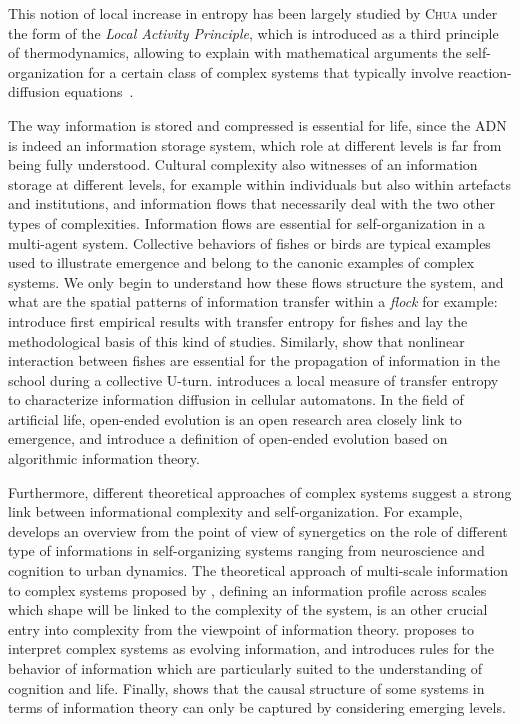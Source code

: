 \documentclass[graybox]{svmult}
\newcommand{\noun}[1]{\textsc{#1}}
\begin{document}
This notion of local increase in entropy has been largely studied by \noun{Chua} under the form of the \emph{Local Activity Principle}, which is introduced as a third principle of thermodynamics, allowing to explain with mathematical arguments the self-organization for a certain class of complex systems that typically involve reaction-diffusion equations~\cite{mainzer2013local}.


The way information is stored and compressed is essential for life, since the ADN is indeed an information storage system, which role at different levels is far from being fully understood. Cultural complexity also witnesses of an information storage at different levels, for example within individuals but also within artefacts and institutions, and information flows that necessarily deal with the two other types of complexities. Information flows are essential for self-organization in a multi-agent system. Collective behaviors of fishes or birds are typical examples used to illustrate emergence and belong to the canonic examples of complex systems. We only begin to understand how these flows structure the system, and what are the spatial patterns of information transfer within a \emph{flock} for example: \cite{crosato2017informative} introduce first empirical results with transfer entropy for fishes and lay the methodological basis of this kind of studies. Similarly, \cite{lecheval2018social} show that nonlinear interaction between fishes are essential for the propagation of information in the school during a collective U-turn. \cite{lizier2008local} introduces a local measure of transfer entropy to characterize information diffusion in cellular automatons. In the field of artificial life, open-ended evolution is an open research area closely link to emergence, and \cite{corominas2018zipf} introduce a definition of open-ended evolution based on algorithmic information theory.

Furthermore, different theoretical approaches of complex systems suggest a strong link between informational complexity and self-organization. For example, \cite{e18060197} develops an overview from the point of view of synergetics on the role of different type of informations in self-organizing systems ranging from neuroscience and cognition to urban dynamics. The theoretical approach of multi-scale information to complex systems proposed by \cite{allen2017multiscale}, defining an information profile across scales which shape will be linked to the complexity of the system, is an other crucial entry into complexity from the viewpoint of information theory. \cite{gershenson2012world} proposes to interpret complex systems as evolving information, and introduces rules for the behavior of information which are particularly suited to the understanding of cognition and life. Finally, \cite{hoel2017map} shows that the causal structure of some systems in terms of information theory can only be captured by considering emerging levels.
\end{document}
